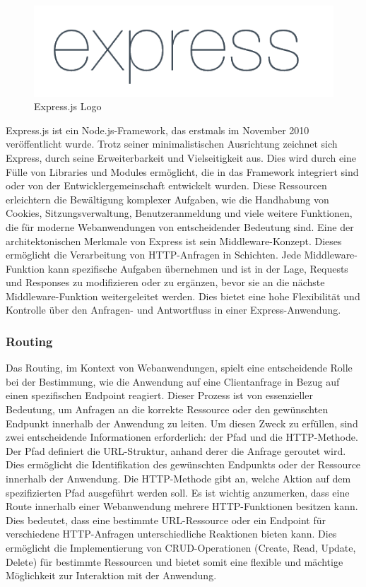 \begin{figure}[h!]
    \centering
    \includegraphics[width=0.8\linewidth]{pics/express_logo.png}
    \caption{Express.js Logo}
    \label{fig:enter-label}
\end{figure}
Express.js ist ein Node.js-Framework, das erstmals im November 2010 veröffentlicht wurde. Trotz seiner minimalistischen Ausrichtung zeichnet sich Express, durch seine Erweiterbarkeit und Vielseitigkeit aus. Dies wird durch eine Fülle von Libraries und Modules ermöglicht, die in das Framework integriert sind oder von der Entwicklergemeinschaft entwickelt wurden. Diese Ressourcen erleichtern die Bewältigung komplexer Aufgaben, wie die Handhabung von Cookies, Sitzungsverwaltung, Benutzeranmeldung und viele weitere Funktionen, die für moderne Webanwendungen von entscheidender Bedeutung sind.
\newline
Eine der architektonischen Merkmale von Express ist sein Middleware-Konzept. Dieses ermöglicht die Verarbeitung von HTTP-Anfragen in Schichten. Jede Middleware-Funktion kann spezifische Aufgaben übernehmen und ist in der Lage, Requests und Responses zu modifizieren oder zu ergänzen, bevor sie an die nächste Middleware-Funktion weitergeleitet werden. Dies bietet eine hohe Flexibilität und Kontrolle über den Anfragen- und Antwortfluss in einer Express-Anwendung.
\cite{Express_js_Introduction}

\subsubsection{Routing}
Das Routing, im Kontext von Webanwendungen, spielt eine entscheidende Rolle bei der Bestimmung, wie die Anwendung auf eine Clientanfrage in Bezug auf einen spezifischen Endpoint reagiert. Dieser Prozess ist von essenzieller Bedeutung, um Anfragen an die korrekte Ressource oder den gewünschten Endpunkt innerhalb der Anwendung zu leiten. Um diesen Zweck zu erfüllen, sind zwei entscheidende Informationen erforderlich: der Pfad und die HTTP-Methode.
\newline
Der Pfad definiert die URL-Struktur, anhand derer die Anfrage geroutet wird. Dies ermöglicht die Identifikation des gewünschten Endpunkts oder der Ressource innerhalb der Anwendung. Die HTTP-Methode gibt an, welche Aktion auf dem spezifizierten Pfad ausgeführt werden soll. Es ist wichtig anzumerken, dass eine Route innerhalb einer Webanwendung mehrere HTTP-Funktionen besitzen kann. Dies bedeutet, dass eine bestimmte URL-Ressource oder ein Endpoint für verschiedene HTTP-Anfragen unterschiedliche Reaktionen bieten kann. Dies ermöglicht die Implementierung von CRUD-Operationen (Create, Read, Update, Delete) für bestimmte Ressourcen und bietet somit eine flexible und mächtige Möglichkeit zur Interaktion mit der Anwendung.
\cite{Express_js_basic_routing}
\cite{Express_js_routing}

